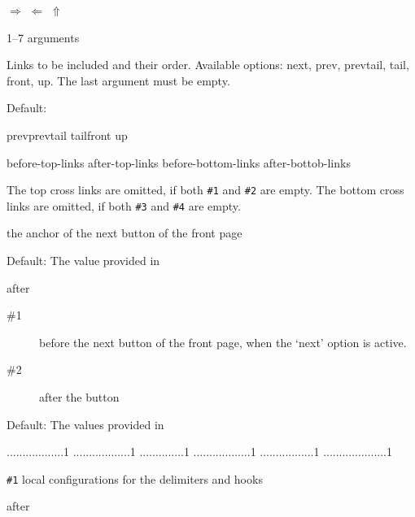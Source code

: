 \documentclass{book}
\begin{document}
\begin{texsource}
   {}{}{$\scriptstyle\Rightarrow$}
   {$\scriptstyle\Leftarrow$}
   {}{}{}{$\scriptstyle\Uparrow$}
\end{texsource}

 {1--7 arguments}\EndDoc

  Links to be included and their order. Available
  options: next, prev, prevtail, tail, front, up.
  The last argument must be empty.

  Default:

\begin{texsource}
   {prev}{prevtail}
   {tail}{front}
   {up}{}
\end{texsource}

 {before-top-links} {after-top-links} {before-bottom-links} {after-bottob-links}\EndDoc

The top cross links are omitted, if both \verb|#1| and \verb|#2| are empty.
The bottom cross links are omitted, if both \verb|#3| and \verb|#4| are empty.

 {the anchor of the next button of the front page}\EndDoc

Default: The value provided in 

 {after}\EndDoc

\begin{description}
  \item[\#1]  before the next button of the front page, when the `next'
       option is active.
  \item[\#2]  after the button
\end{description}

    Default: The values provided in 

\begin{texsource}
..................1
..................1
..............1
..................1
.................1
....................1
\end{texsource}

  \verb|#1| local configurations for the delimiters and hooks

 {after}\EndDoc
\end{document}
